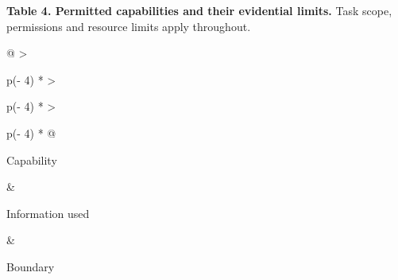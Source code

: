 \documentclass[
  11pt,
]{article}
\begin{document}
\begin{table}[tp]
\textbf{Table 4. Permitted capabilities and their evidential limits.}
Task scope, permissions and resource limits apply throughout.\par\smallskip
{\small
\begin{tabular}{@{}
  >{\raggedright\arraybackslash}p{(\columnwidth - 4\tabcolsep) * }
  >{\raggedright\arraybackslash}p{(\columnwidth - 4\tabcolsep) * }
  >{\raggedright\arraybackslash}p{(\columnwidth - 4\tabcolsep) * }@{}}
\toprule\noalign{}
\begin{minipage}[b]{\linewidth}\raggedright
Capability
\end{minipage} & \begin{minipage}[b]{\linewidth}\raggedright
Information used
\end{minipage} & \begin{minipage}[b]{\linewidth}\raggedright
Boundary
\end{minipage} \\
\midrule\noalign{}


\end{tabular}}
\end{table}
\end{document}
